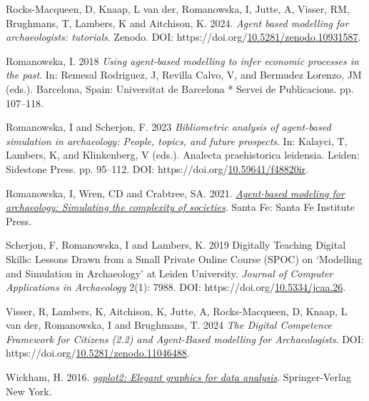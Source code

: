 \documentclass[
]{article}
\newlength{\cslhangindent}
\newlength{\cslentryspacingunit} %
\newenvironment{CSLReferences}[2] %
 {%
  \setlength{\parindent}{0pt}
  \ifodd #1
  \let\oldpar\par
  \def\par{\hangindent=\cslhangindent\oldpar}
  \fi
  \setlength{\parskip}{#2\cslentryspacingunit}
 }%
 {}
\begin{document}
\begin{CSLReferences}{1}{0}
\leavevmode{}%
Rocks-Macqueen, D, Knaap, L van der, Romanowska, I, Jutte, A, Visser, RM, Brughmans, T, Lambers, K and Aitchison, K. 2024. \emph{Agent based modelling for archaeologists: tutorials}. Zenodo. DOI: https://doi.org/\href{https://doi.org/10.5281/zenodo.10931587}{10.5281/zenodo.10931587}.

\leavevmode{}%
Romanowska, I. 2018 \emph{Using agent-based modelling to infer economic processes in the past}. In: Remesal Rodriguez, J, Revilla Calvo, V, and Bermudez Lorenzo, JM (eds.). Barcelona, Spain: Universitat de Barcelona * Servei de Publicacions. pp. 107--118.

\leavevmode{}%
Romanowska, I and Scherjon, F. 2023 \emph{Bibliometric analysis of agent-based simulation in archaeology: People, topics, and future prospects}. In: Kalayci, T, Lambers, K, and Klinkenberg, V (eds.). Analecta praehistorica leidensia. Leiden: Sidestone Press. pp. 95--112. DOI: https://doi.org/\href{https://doi.org/10.59641/f48820ir}{10.59641/f48820ir}.

\leavevmode{}%
Romanowska, I, Wren, CD and Crabtree, SA. 2021. \emph{\href{https://www.sfipress.org/books/agent-based-modeling-archaeology}{Agent-based modeling for archaeology: Simulating the complexity of societies}}. Santa Fe: Santa Fe Institute Press.

\leavevmode{}%
Scherjon, F, Romanowska, I and Lambers, K. 2019 Digitally Teaching Digital Skills: Lessons Drawn from a Small Private Online Course (SPOC) on {`}Modelling and Simulation in Archaeology{'} at Leiden University. \emph{Journal of Computer Applications in Archaeology} 2(1): 7988. DOI: https://doi.org/\href{https://doi.org/10.5334/jcaa.26}{10.5334/jcaa.26}.

\leavevmode{}%
Visser, R, Lambers, K, Aitchison, K, Jutte, A, Rocks-Macqueen, D, Knaap, L van der, Romanowska, I and Brughmans, T. 2024 \emph{The Digital Competence Framework for Citizens (2.2) and Agent-Based modelling for Archaeologists}. DOI: https://doi.org/\href{https://doi.org/10.5281/zenodo.11046488}{10.5281/zenodo.11046488}.

\leavevmode{}%
Wickham, H. 2016. \emph{\href{http://ggplot2.org}{ggplot2: Elegant graphics for data analysis}}. Springer-Verlag New York.


\end{CSLReferences}
\end{document}
